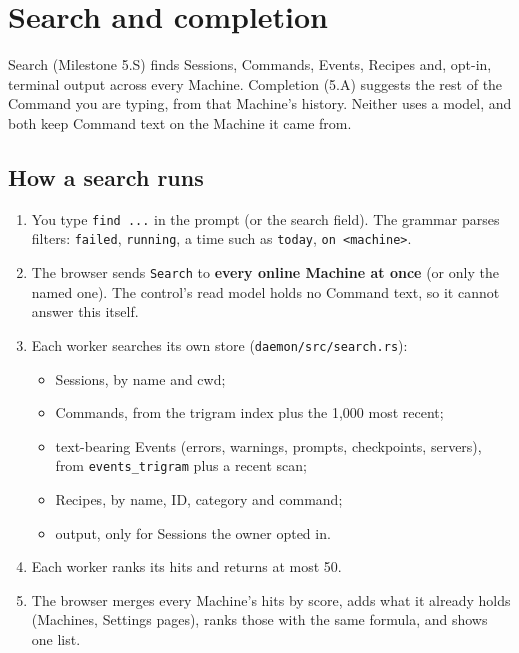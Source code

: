 \chapter{\texorpdfstring{Search and completion}{Search and completion}}

Search (Milestone 5.S) finds Sessions, Commands, Events, Recipes and, opt-in, terminal output across every Machine. Completion (5.A) suggests the rest of the Command you are typing, from that Machine's history. Neither uses a model, and both keep Command text on the Machine it came from.

\section{\texorpdfstring{How a search runs}{How a search runs}}

\begin{enumerate}
\item You type \texttt{find\ .\allowbreak{}.\allowbreak{}.\allowbreak{}} in the prompt (or the search field). The grammar parses filters: \texttt{failed}, \texttt{running}, a time such as \texttt{today}, \texttt{on\ \textless{}machine\textgreater{}}.
\item The browser sends \texttt{Search} to \textbf{every online Machine at once} (or only the named one). The control's read model holds no Command text, so it cannot answer this itself.
\item Each worker searches its own store (\texttt{daemon/\allowbreak{}src/\allowbreak{}search.\allowbreak{}rs}):
\begin{itemize}
\item Sessions, by name and cwd;
\item Commands, from the trigram index plus the 1,000 most recent;
\item text-bearing Events (errors, warnings, prompts, checkpoints, servers), from \texttt{events\_\allowbreak{}trigram} plus a recent scan;
\item Recipes, by name, ID, category and command;
\item output, only for Sessions the owner opted in.
\end{itemize}
\item Each worker ranks its hits and returns at most 50.
\item The browser merges every Machine's hits by score, adds what it already holds (Machines, Settings pages), ranks those with the same formula, and shows one list.
\end{enumerate}

